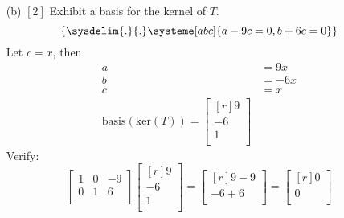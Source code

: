 \documentclass[12pt]{article}
\theoremstyle{definition}
\newtheorem*{solution}{Solution} %
\theoremstyle{plain}
\begin{document}
\begin{enumerate}[wide, labelwidth=!, labelindent=0pt]
\begin{solution}
\begin{align*}
	T(1)=\begin{bmatrix}[r]1\\-1+0\\\end{bmatrix}, \quad T(t)&=\begin{bmatrix}[r]3\\-3+1\\\end{bmatrix}, \quad T(t^2)=\begin{bmatrix}[r]9\\-9+6\\\end{bmatrix}
	\end{align*}
	We combine these three $2\times 1$ matrices into a single matrix
	\[ [T]_F^E = \begin{bmatrix}[rrr]1&3&9\\-1&-2&-3\\\end{bmatrix} \xrightarrow[]{rref} \begin{bmatrix}[rrr]1&0&-9\\0&1&6\\\end{bmatrix} \]
	Rank is 2.
	\end{solution}
\item[(b)] $[2]$ Exhibit a basis for the kernel of $T$.
	\[ \left\{\sysdelim{.}{.}\systeme[abc]{a-9c=0,b+6c=0}\right\} \]
	Let $c=x$, then
	\begin{align*}
	a&=9x\\
	b&=-6x\\
	c&=x\\
	\mathrm{basis}(\mathrm{ker}(T))=\begin{bmatrix}[r]9\\-6\\1\\\end{bmatrix}
	\end{align*}
	Verify:
	\[ \begin{bmatrix}1&0&-9\\0&1&6\\\end{bmatrix}\begin{bmatrix}[r]9\\-6\\1\\\end{bmatrix}=\begin{bmatrix}[r]9-9\\-6+6\\\end{bmatrix} = \begin{bmatrix}[r]0\\0\\\end{bmatrix} \]

\end{enumerate}
\end{document}
